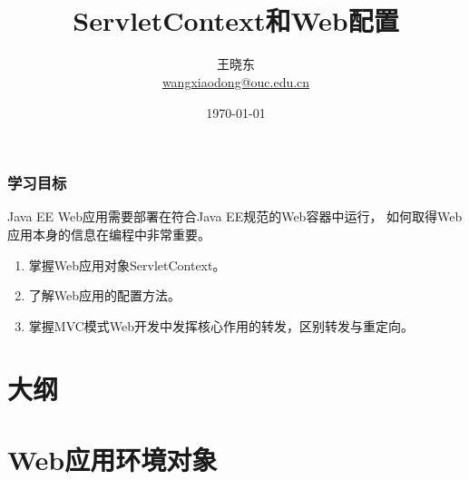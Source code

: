 
\title[KevinW@OUC]{\\  
ServletContext和Web配置}
\author[王晓东]{王晓东\\
  \href{mailto:wangxiaodong@ouc.edu.cn}{\footnotesize wangxiaodong@ouc.edu.cn}}
\date{\today}


\frame{\titlepage}

\begin{frame}
  \frametitle{学习目标}

  {\hei\Blue Java EE Web应用需要部署在符合Java EE规范的Web容器中运行，
    如何取得Web应用本身的信息在编程中非常重要。}

  \begin{enumerate}
  \item 掌握Web应用对象ServletContext。
  \item 了解Web应用的配置方法。
  \item 掌握MVC模式Web开发中发挥核心作用的转发，区别{\hei 转发}与{\hei 重定向}。
  \end{enumerate}  
\end{frame} 
\section*{大纲}

\section{Web应用环境对象}

